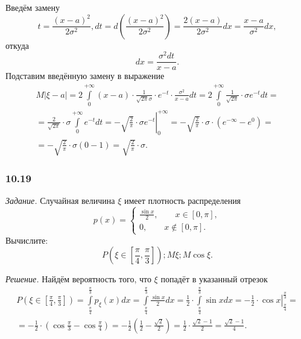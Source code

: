 Введём замену
$$t = \frac{ \left( x-a \right)^2}{2 \sigma^2},
dt = d \left( \frac{ \left( x-a \right)^2}{2 \sigma^2} \right) = \frac{2 \left( x-a \right) }{2 \sigma^2} dx = \frac{x-a}{ \sigma^2} dx,$$
откуда
$$dx = \frac{ \sigma^2 dt}{x-a}.$$
Подставим введённую замену в выражение
\begin{equation*}
\begin{split}
M \left| \xi - a \right| =
2 \int \limits_0^{+ \infty } \left( x-a \right) \cdot \frac{1}{ \sqrt{2 \pi } \sigma } \cdot e^{-t} \cdot \frac{ \sigma^2}{x-a} dt =
2 \int \limits_0^{+ \infty } \frac{1}{ \sqrt{2 \pi }} \cdot \sigma e^{-t} dt = \\
= \frac{2}{ \sqrt{2 \pi }} \cdot \sigma \int \limits_0^{+ \infty } e^{-t} dt =
\left. - \sqrt{ \frac{2}{ \pi }} \cdot \sigma e^{-t} \right|_0^{+ \infty } =
- \sqrt{ \frac{2}{ \pi }} \cdot \sigma \cdot \left( e^{- \infty } - e^0 \right) = \\
= - \sqrt{ \frac{2}{ \pi }} \cdot \sigma \left( 0 - 1 \right) =
\sqrt{ \frac{2}{ \pi }} \cdot \sigma.
\end{split}
\end{equation*}

\subsubsection*{10.19}

\textit{Задание.} Случайная величина $ \xi $ имеет плотность распределения
$$p \left( x \right) =
\begin{cases}
\frac{ \sin x}{2}, \qquad x \in \left[ 0, \pi \right], \\
0, \qquad x \notin \left[ 0, \pi \right].
\end{cases}$$
Вычислите:
$$P \left( \xi \in \left[ \frac{ \pi }{4}, \frac{ \pi }{3} \right] \right);
M \xi;
M \cos \xi.$$

\textit{Решение.} Найдём вероятность того, что $ \xi $ попадёт в указанный отрезок
\begin{equation*}
\begin{split}
P \left( \xi \in \left[ \frac{ \pi }{4}, \frac{ \pi }{3} \right] \right) =
\int \limits_{ \frac{ \pi }{4}}^{ \frac{ \pi }{3}} p_{ \xi } \left( x \right) dx =
\int \limits_{ \frac{ \pi }{4}}^{ \frac{ \pi }{3}} \frac{ \sin x}{2} dx =
\frac{1}{2} \cdot \int \limits_{ \frac{ \pi }{4}}^{ \frac{ \pi }{3}} \sin x dx =
\left. - \frac{1}{2} \cdot \cos x \right|_{ \frac{ \pi }{4}}^{ \frac{ \pi }{3}} = \\
= - \frac{1}{2} \cdot \left( \cos \frac{ \pi }{3} - \cos \frac{ \pi }{4} \right) =
- \frac{1}{2} \left( \frac{1}{2} - \frac{ \sqrt{2}}{2} \right) =
\frac{1}{2} \cdot \frac{ \sqrt{2} - 1}{2} =
\frac{ \sqrt{2} - 1}{4}.
\end{split}
\end{equation*}

